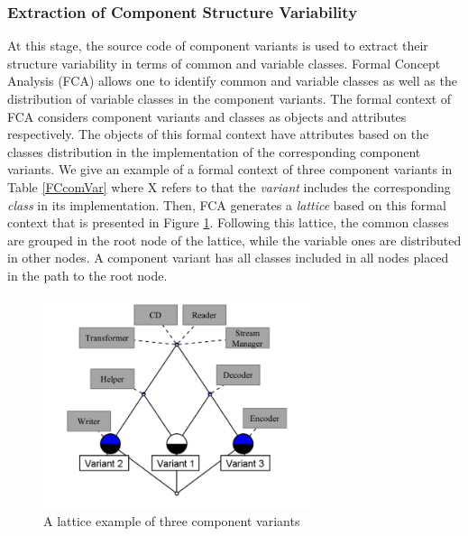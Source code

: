 \documentclass[graybox]{svmult}
\begin{document}
\subsubsection{Extraction of Component Structure Variability}
At this stage, the source code of component variants is used to extract their structure variability in terms of common and variable classes.
Formal Concept Analysis (FCA) allows one to identify common and variable classes as well as the distribution of variable classes in the component variants. The formal context of FCA considers component variants and classes as objects and attributes respectively. The objects of this formal context have attributes based on the classes distribution in the implementation of the corresponding component variants. We give an example of a formal context of three component variants in Table \ref{FCcomVar} where X refers to that the \textit{variant} includes the corresponding \textit{class} in its implementation. Then, FCA generates a \textit{lattice} based on this formal context that is presented in Figure \ref{fig:lattComVar}. Following this lattice, the common classes are grouped in the root node of the lattice, while the variable ones are distributed in other nodes. A component variant has all classes included in all nodes placed in the path to the root node.

\begin{table}[h]
 \centering
 \caption{An example of formal context of three component variants}
\end{table}

\begin{figure}[h]
\centering
\includegraphics[width=0.7\textwidth]{figs/component_variant_lattice.png}
\caption{A lattice example of three component variants}
\label{fig:lattComVar}
\end{figure}
\end{document}
